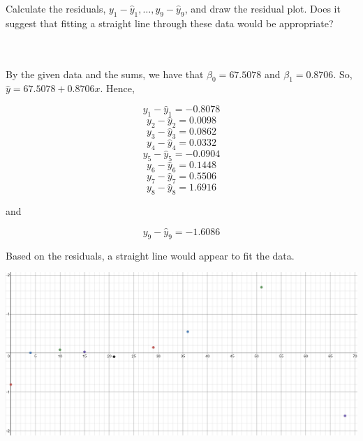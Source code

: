 Calculate the residuals, $y_1-\hat{y}_1,\ldots, y_9-\hat{y}_9$, and draw the residual plot. Does it
suggest that fitting a straight line through these data would be appropriate?\\\\

\begin{solution}\renewcommand{\qedsymbol}{}\ \\
    By the given data and the sums, we have that $\beta_0=67.5078$ and $\beta_1=0.8706$. So,
    $\hat{y}=67.5078+0.8706x$. Hence,

    $$y_1-\hat{y}_1=-0.8078$$
    $$y_2-\hat{y}_2=0.0098$$
    $$y_3-\hat{y}_3=0.0862$$
    $$y_4-\hat{y}_4=0.0332$$
    $$y_5-\hat{y}_5=-0.0904$$
    $$y_6-\hat{y}_6=0.1448$$
    $$y_7-\hat{y}_7=0.5506$$
    $$y_8-\hat{y}_8=1.6916$$
    
    and
    
    $$y_9-\hat{y}_9=-1.6086$$
    
    Based on the residuals, a straight line would appear to fit the data.

    \begin{center}
        \includegraphics[scale=0.5]{11-2-3.JPG}
    \end{center}

\end{solution}